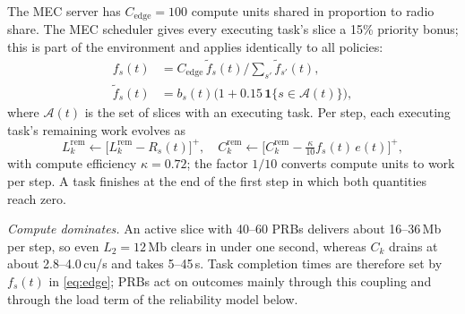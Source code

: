 \documentclass[conference]{IEEEtran}
\newcommand{\ind}[1]{\mathbf{1}\{#1\}}
\begin{document}
The MEC server has $C_{\mathrm{edge}}=100$ compute units shared in proportion to radio share. The MEC scheduler gives every executing task's slice a 15\% priority bonus; this is part of the environment and applies identically to all policies:
\begin{equation}
\begin{aligned}
f_s(t)&=C_{\mathrm{edge}}\,\tilde f_s(t)\Big/\textstyle\sum_{s'}\tilde f_{s'}(t),\\
\tilde f_s(t)&=b_s(t)\big(1+0.15\,\ind{s\in\mathcal{A}(t)}\big),
\end{aligned}
\label{eq:edge}
\end{equation}
where $\mathcal{A}(t)$ is the set of slices with an executing task. Per step, each executing task's remaining work evolves as
\begin{equation}
L_k^{\mathrm{rem}}\leftarrow\big[L_k^{\mathrm{rem}}-R_s(t)\big]^+,\quad C_k^{\mathrm{rem}}\leftarrow\big[C_k^{\mathrm{rem}}-\tfrac{\kappa}{10}f_s(t)\,e(t)\big]^+,
\label{eq:progress}
\end{equation}
with compute efficiency $\kappa=0.72$; the factor $1/10$ converts compute units to work per step. A task finishes at the end of the first step in which both quantities reach zero.

\emph{Compute dominates.} An active slice with 40--60 PRBs delivers about 16--36\,Mb per step, so even $L_2=12$\,Mb clears in under one second, whereas $C_k$ drains at about 2.8--4.0\,cu/s and takes 5--45\,s. Task completion times are therefore set by $f_s(t)$ in \eqref{eq:edge}; PRBs act on outcomes mainly through this coupling and through the load term of the reliability model below.
\end{document}
